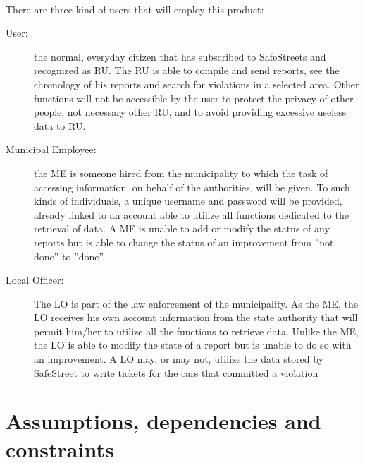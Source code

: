 			\paragraph{}
				There are three kind of users that will employ this product:
				\begin{description}
					\item[User:] the normal, everyday citizen that has subscribed to SafeStreets and recognized as RU. The RU is able to compile and send reports, see the chronology of his reports and search for violations in a selected area. Other functions will not be accessible by the user to protect the privacy of other people, not necessary other RU, and to avoid providing excessive useless data to RU.
					\item[Municipal Employee:] the ME is someone hired from the municipality to which the task of accessing information, on behalf of the authorities, will be given. To such kinds of individuals, a unique username and password will be provided, already linked to an account able to utilize all functions dedicated to the retrieval of data. A ME is unable to add or modify the status of any reports but is able to change the status of an improvement from ''not done'' to ''done''.
					\item[Local Officer:] The LO is part of the law enforcement of the municipality. As the ME, the LO receives his own account information from the state authority that will permit him/her to utilize all the functions to retrieve data. Unlike the ME, the LO is able to modify the state of a report but is unable to do so with an improvement. A LO may, or may not, utilize the data stored by SafeStreet to write tickets for the cars that committed a violation
				\end{description}
		\section{Assumptions, dependencies and constraints} \label{sez:Assumptions}
